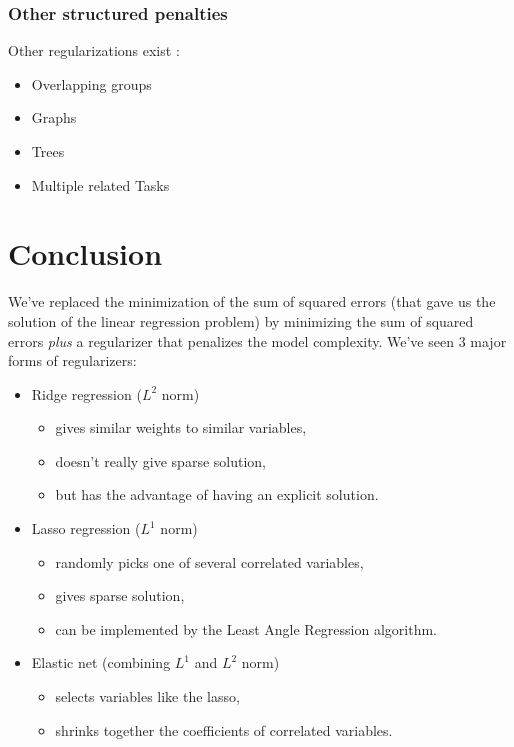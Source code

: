 \documentclass[a4paper,12pt]{article}
\begin{document}
\subsubsection{Other structured penalties}
Other regularizations exist :
\begin{itemize}
\item Overlapping groups
\item Graphs
\item Trees
\item Multiple related Tasks
\end{itemize}

\section{Conclusion}
We've replaced the minimization of the sum of squared errors (that gave us the solution of the linear regression problem) by minimizing the sum of squared errors \emph{plus} a regularizer that penalizes the model complexity. We've seen 3 major forms of regularizers:
\begin{itemize}
\item Ridge regression ($L^2$ norm)
	\begin{itemize}
	\item gives similar weights to similar variables,
	\item doesn't really give sparse solution,
	\item but has the advantage of having an explicit solution.
	\end{itemize}
\item Lasso regression ($L^1$ norm)
	\begin{itemize}
	\item randomly picks one of several correlated variables,
	\item gives sparse solution,
	\item can be implemented by the Least Angle Regression algorithm.
	\end{itemize}
\item Elastic net (combining $L^1$ and $L^2$ norm)
	\begin{itemize}
	\item selects variables like the lasso,
	\item shrinks together the coefficients of correlated variables.
	\end{itemize}
\end{itemize}
\end{document}
